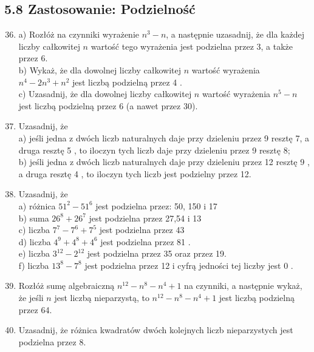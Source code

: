 \documentclass[10pt]{article}
\begin{document}
\subsection*{5.8 Zastosowanie: Podzielność}
\begin{enumerate}
  \setcounter{enumi}{35}
  \item a) Rozłóż na czynniki wyrażenie \(n^{3}-n\), a następnie uzasadnij, że dla każdej liczby całkowitej \(n\) wartość tego wyrażenia jest podzielna przez 3, a także przez 6.\\
b) Wykaż, że dla dowolnej liczby całkowitej \(n\) wartość wyrażenia \(n^{4}-2 n^{3}+n^{2}\) jest liczbą podzielną przez 4 .\\
c) Uzasadnij, że dla dowolnej liczby całkowitej \(n\) wartość wyrażenia \(n^{5}-n\) jest liczbą podzielną przez 6 (a nawet przez 30).
  \item Uzasadnij, że\\
a) jeśli jedna z dwóch liczb naturalnych daje przy dzieleniu przez 9 resztę 7, a druga resztę 5 , to iloczyn tych liczb daje przy dzieleniu przez 9 resztę 8;\\
b) jeśli jedna z dwóch liczb naturalnych daje przy dzieleniu przez 12 resztę 9 , a druga resztę 4 , to iloczyn tych liczb jest podzielny przez 12.
  \item Uzasadnij, że\\
a) różnica \(51^{2}-51^{6}\) jest podzielna przez: 50, 150 i 17\\
b) suma \(26^{8}+26^{7}\) jest podzielna przez 27,54 i 13\\
c) liczba \(7^{7}-7^{6}+7^{5}\) jest podzielna przez 43\\
d) liczba \(4^{9}+4^{8}+4^{6}\) jest podzielna przez 81 .\\
e) liczba \(3^{12}-2^{12}\) jest podzielna przez 35 oraz przez 19.\\
f) liczba \(13^{8}-7^{8}\) jest podzielna przez 12 i cyfrą jedności tej liczby jest 0 .
  \item Rozłóż sumę algebraiczną \(n^{12}-n^{8}-n^{4}+1\) na czynniki, a następnie wykaż, że jeśli \(n\) jest liczbą nieparzystą, to \(n^{12}-n^{8}-n^{4}+1\) jest liczbą podzielną przez 64.
  \item Uzasadnij, że różnica kwadratów dwóch kolejnych liczb nieparzystych jest podzielna przez 8.
\end{enumerate}
\end{document}
